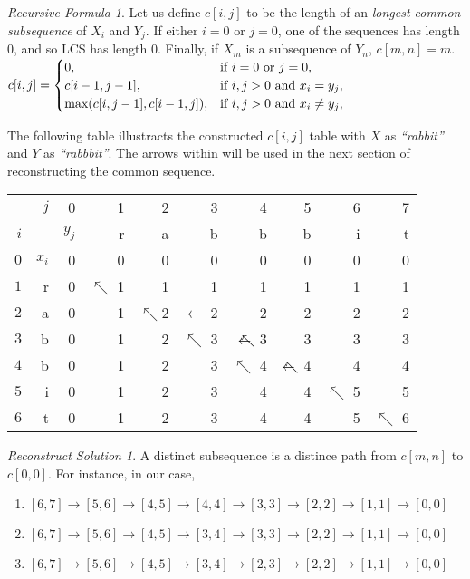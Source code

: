 \documentclass[UTF8]{ctexart}
\theoremstyle{remark}
\begin{document}
\newtheorem*{recursive}{Recursive Formula}
\begin{recursive}
Let us define $c[i,j]$ to be the length of an \emph{longest common subsequence} of $X_i$ and $Y_j$.
If either $i=0$ or $j=0$, one of the sequences has length 0, and so LCS has length 0. Finally, if $X_m$ is a subsequence of $Y_n$, $c[m,n] = m$.
\begin{math}
\\
c[i,j] = 
	\begin{cases}
		0,& \text{if } i = 0 \text{ or } j = 0, \\
		c[i-1, j-1], & \text{if } i,j > 0 \text{ and } x_i = y_j, \\
		\text{max}(c[i, j-1], c[i-1, j]), & \text{if } i,j>0 \text{ and } x_i \neq y_j, 
	\end{cases}
\end{math}

The following table illustracts the constructed $c[i,j]$ table with $X$ as \emph{``rabbit''} and $Y$ as \emph{``rabbbit''}. The arrows within will be used in the next section of reconstructing the common sequence.

\begin{tabular}{rrrrrrrrrr}
	 	& $j$	& 0	& 1	& 2	& 3	& 4	& 5	& 6	& 7	 \\ 	
	$i$	& & $y_j$	& r	& a	& b	& b	& b	& i	& t	 \\ 	
	$0$	& $x_i$	 & 0 & 0	& 0	& 0	& 0	& 0	& 0	& 0	 \\ 	
	$1$	& r	& 0	&$\nwarrow$ 1	& 1	& 1	& 1	& 1	& 1	& 1	 \\ 	
	$2$	& a	& 0	& 1	& $\nwarrow$2	&  $\leftarrow$ 2& 2		& 2	& 2	& 2	 \\ 	
	$3$	& b & 0 & 1	& 2	&$\nwarrow$ 3	&$\lnwarrow$  3 & 3		& 3	& 3	 \\ 	
	$4$	& b	& 0 & 1	& 2	& 3	&$\nwarrow$ 4	& $\lnwarrow$  4	&4	& 4	 \\ 	
	$5$	& i	& 0 & 1	& 2	& 3	& 4	& 4				& $\nwarrow$ 5		& 5	 \\ 	
	$6$	& t & 0 & 1	& 2	& 3	& 4	& 4	& 5								& $\nwarrow$ 6	 \\ 	

\end{tabular}
\end{recursive}

\newtheorem*{recon}{Reconstruct Solution}
\begin{recon}
A distinct subsequence is a distince path from $c[m,n]$ to $c[0,0]$. For instance, in our case, 
\begin{enumerate}
	\item $[6,7] \rightarrow [5, 6] \rightarrow [4, 5] \rightarrow [4, 4] \rightarrow [3, 3] \rightarrow [2, 2] \rightarrow [1, 1] \rightarrow [0,0]$ 
	\item $[6,7] \rightarrow [5, 6] \rightarrow [4, 5] \rightarrow [3, 4] \rightarrow [3, 3] \rightarrow [2, 2] \rightarrow [1, 1] \rightarrow [0,0]$
	\item $[6,7] \rightarrow [5, 6] \rightarrow [4, 5] \rightarrow [3, 4] \rightarrow [2, 3] \rightarrow [2, 2] \rightarrow [1, 1] \rightarrow [0,0]$
\end{enumerate}
\end{recon}
\end{document}
